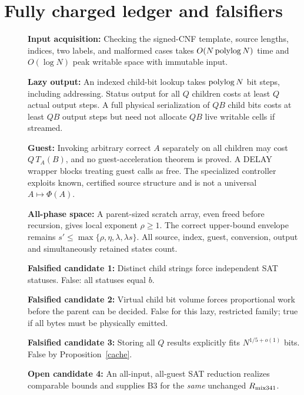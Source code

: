 \documentclass[11pt]{article}
\begin{document}
\section{Fully charged ledger and falsifiers}
\begin{description}
\item[] \textbf{Input acquisition:} Checking the signed-CNF template, source lengths, indices, two labels, and malformed cases takes \(O(N\,{\rm polylog}\,N)\) time and \(O(\log N)\) peak writable space with immutable input.
\item[] \textbf{Lazy output:} An indexed child-bit lookup takes \({\rm polylog}\,N\) bit steps, including addressing. Status output for all \(Q\) children costs at least \(Q\) actual output steps. A full physical serialization of \(QB\) child bits costs at least \(QB\) output steps but need not allocate \(QB\) live writable cells if streamed.
\item[] \textbf{Guest:} Invoking arbitrary correct \(A\) separately on all children may cost \(Q\,T_A(B)\), and no guest-acceleration theorem is proved. A DELAY wrapper blocks treating guest calls as free. The specialized controller exploits known, certified source structure and is not a universal \(A\mapsto\Phi(A)\).
\item[] \textbf{All-phase space:} A parent-sized scratch array, even freed before recursion, gives local exponent \(\rho\ge1\). The correct upper-bound envelope remains \(s'\le\max\{\rho,\eta,\lambda,\lambda s\}\). All source, index, guest, conversion, output and simultaneously retained states count.
\item[] \textbf{Falsified candidate 1:} Distinct child strings force independent SAT statuses. False: all statuses equal \(b\).
\item[] \textbf{Falsified candidate 2:} Virtual child bit volume forces proportional work before the parent can be decided. False for this lazy, restricted family; true if all bytes must be physically emitted.
\item[] \textbf{Falsified candidate 3:} Storing all \(Q\) results explicitly fits \(N^{1/5+o(1)}\) bits. False by Proposition~\ref{cache}.
\item[] \textbf{Open candidate 4:} An all-input, all-guest SAT reduction realizes comparable bounds and supplies B3 for the \emph{same} unchanged \(R_{\rm mix341}\).
\end{description}
\end{document}
